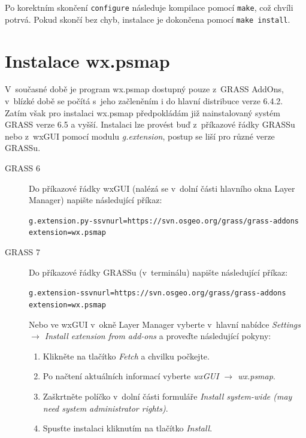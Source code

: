 \documentclass[a4paper,12pt,draft]{article}
\begin{document}
Po korektním skončení \verb|configure| následuje kompilace pomocí
\verb|make|, což chvíli potrvá. Pokud skončí bez chyb, instalace je
dokončena pomocí \verb|make install|.


\section{Instalace wx.psmap}
\label{priloha:instalace_GUI}
V~současné době je program wx.psmap dostupný pouze z~GRASS AddOns, v~blízké
době se počítá s~jeho začleněním i do hlavní distribuce verze 6.4.2. Zatím však
pro instalaci wx.psmap předpokládám již nainstalovaný systém GRASS verze 6.5
a vyšší. Instalaci lze provést buď z~příkazové řádky GRASSu nebo z~wxGUI pomocí
modulu \emph{g.extension}, postup se liší pro různé verze GRASSu.


\begin{description}
\item[GRASS 6]
Do příkazové řádky wxGUI (nalézá se v~dolní části hlavního okna Layer Manager)
napište následující příkaz:

\begin{alltt}
g.extension.py -s svnurl=https://svn.osgeo.org/grass/grass-addons
 extension=wx.psmap
\end{alltt}

\item[GRASS 7]
Do příkazové řádky GRASSu (v~terminálu) napište následující příkaz:

\begin{alltt}
g.extension -s svnurl=https://svn.osgeo.org/grass/grass-addons
 extension=wx.psmap
\end{alltt}

Nebo ve wxGUI v~okně Layer Manager vyberte v~hlavní nabídce
\emph{Settings $\rightarrow$ Install extension from add-ons} a proveďte
následující pokyny:
\begin{enumerate}
\item   Klikněte na tlačítko \emph{Fetch} a chvilku počkejte.
\item Po načtení aktuálních informací vyberte \emph{wxGUI $\rightarrow$ wx.psmap}.
\item Zaškrtněte políčko v~dolní části formuláře \emph{Install system-wide (may need system administrator rights)}.
\item Spusťte instalaci kliknutím na tlačítko \emph{Install}.
\end{enumerate}

\end{description}
\end{document}
